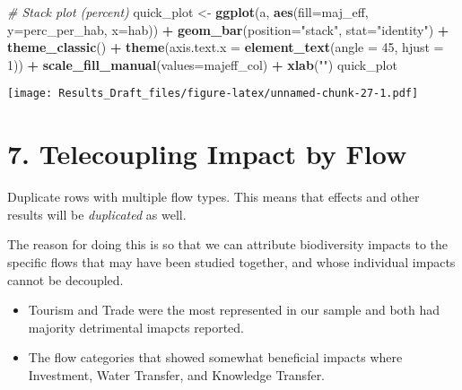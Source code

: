 \documentclass[
]{article}
\newenvironment{Shaded}{\begin{snugshade}}{\end{snugshade}}
\newcommand{\CommentTok}[1]{\textcolor[rgb]{0.56,0.35,0.01}{\textit{#1}}}
\newcommand{\DataTypeTok}[1]{\textcolor[rgb]{0.13,0.29,0.53}{#1}}
\newcommand{\DecValTok}[1]{\textcolor[rgb]{0.00,0.00,0.81}{#1}}
\newcommand{\KeywordTok}[1]{\textcolor[rgb]{0.13,0.29,0.53}{\textbf{#1}}}
\newcommand{\NormalTok}[1]{#1}
\newcommand{\OperatorTok}[1]{\textcolor[rgb]{0.81,0.36,0.00}{\textbf{#1}}}
\newcommand{\StringTok}[1]{\textcolor[rgb]{0.31,0.60,0.02}{#1}}
\providecommand{\tightlist}{%
  \setlength{\itemsep}{0pt}\setlength{\parskip}{0pt}}
\begin{document}
\begin{Shaded}
\begin{Highlighting}[]
\CommentTok{# Stack plot (percent)}
\NormalTok{  quick_plot <-}\StringTok{ }\KeywordTok{ggplot}\NormalTok{(a, }\KeywordTok{aes}\NormalTok{(}\DataTypeTok{fill=}\NormalTok{maj_eff, }\DataTypeTok{y=}\NormalTok{perc_per_hab, }\DataTypeTok{x=}\NormalTok{hab)) }\OperatorTok{+}\StringTok{ }
\StringTok{                }\KeywordTok{geom_bar}\NormalTok{(}\DataTypeTok{position=}\StringTok{"stack"}\NormalTok{, }\DataTypeTok{stat=}\StringTok{"identity"}\NormalTok{) }\OperatorTok{+}
\StringTok{                }\KeywordTok{theme_classic}\NormalTok{() }\OperatorTok{+}
\StringTok{                }\KeywordTok{theme}\NormalTok{(}\DataTypeTok{axis.text.x =} \KeywordTok{element_text}\NormalTok{(}\DataTypeTok{angle =} \DecValTok{45}\NormalTok{, }\DataTypeTok{hjust =} \DecValTok{1}\NormalTok{)) }\OperatorTok{+}
\StringTok{                }\KeywordTok{scale_fill_manual}\NormalTok{(}\DataTypeTok{values=}\NormalTok{majeff_col) }\OperatorTok{+}
\StringTok{                }\KeywordTok{xlab}\NormalTok{(}\StringTok{""}\NormalTok{)}
\NormalTok{quick_plot}
\end{Highlighting}
\end{Shaded}

\texttt{[image: Results\_Draft\_files/figure-latex/unnamed-chunk-27-1.pdf]}

\hypertarget{telecoupling-impact-by-flow}{%
\section{7. Telecoupling Impact by
Flow}\label{telecoupling-impact-by-flow}}

Duplicate rows with multiple flow types. This means that effects and
other results will be \emph{duplicated} as well.

The reason for doing this is so that we can attribute biodiversity
impacts to the specific flows that may have been studied together, and
whose individual impacts cannot be decoupled.

\begin{itemize}
\tightlist
\item
  Tourism and Trade were the most represented in our sample and both had
  majority detrimental imapcts reported.
\item
  The flow categories that showed somewhat beneficial impacts where
  Investment, Water Transfer, and Knowledge Transfer.
\end{itemize}
\end{document}

